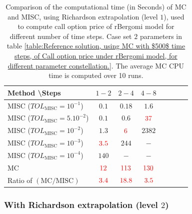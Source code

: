 \begin{table}[h!]
	\centering
	\begin{tabular}{l*{6}{c}r}
		Method \textbackslash  Steps            & $1-2$ & $2-4$ & $4-8$   \\
		\hline
		MISC ($TOL_{\text{MISC}}=10^{-1}$)  & $0.1$ & $0.18$ & $1.6$  \\
		MISC ($TOL_{\text{MISC}}=5.10^{-2}$)  & $0.1$ & $0.6$ & ${\color{red}37}$  \\
		MISC ($TOL_{\text{MISC}}=10^{-2}$)  & $1.3$ & ${\color{red}6}$ & $2382$  \\
		MISC ($TOL_{\text{MISC}}=10^{-3}$)  & ${\color{red}3.5}$ & $ 244$ & $-$   \\
		
		MISC ($TOL_{\text{MISC}}=10^{-4}$)  & $140$ & $-$ & $-$ \\
		\hline	
		MC  &${\color{red}12}$ & ${\color{red}113}$  & ${\color{red}130}$   \\
		
		\hline	
		Ratio of $\left(\text{MC}/ \text{MISC} \right)$  &${\color{red} 3.4
		}$ & ${\color{red}     18.8
		}$  & ${\color{red} 3.5}
		$  \\
		\hline
		\end{tabular}
		\caption{Comparison of the computational time (in Seconds) of  MC and MISC, using Richardson extrapolation (level $1$), used to compute call option price of rBergomi model for different number of time steps. Case set $2$ parameters in table \ref{table:Reference solution, using MC with $500$ time steps, of Call option price under rBergomi model, for different parameter constellation.}. The
			average MC CPU time is computed over 10 runs.}
		\label{Comparsion of the computational time of  MC and MISC, using Richardson extrapolation (level $1$), used to compute Call option price of rBergomi model for different number of time steps. Case set $2$ parameters,linear}
		\end{table}
		
		\FloatBarrier
	\subsubsection*{With Richardson extrapolation (level $2$)}
		

